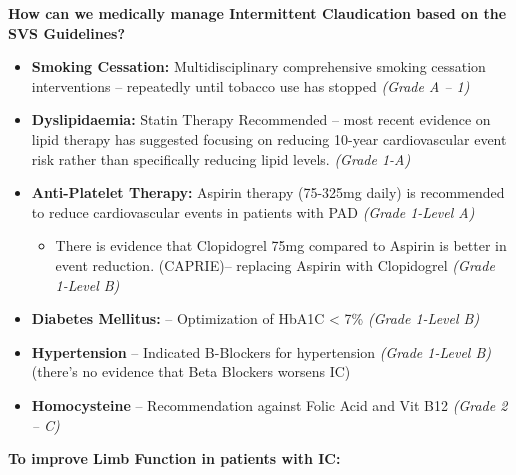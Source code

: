 \documentclass[
]{book}
\providecommand{\tightlist}{%
  \setlength{\itemsep}{0pt}\setlength{\parskip}{0pt}}
\begin{document}
\textbf{How can we medically manage Intermittent Claudication based on the SVS
Guidelines?}

\begin{itemize}
\item
  \textbf{Smoking Cessation:} Multidisciplinary comprehensive smoking
  cessation interventions -- repeatedly until tobacco use has stopped
  \emph{(Grade A -- 1)}
\item
  \textbf{Dyslipidaemia:} Statin Therapy Recommended -- most recent evidence on
  lipid therapy has suggested focusing on reducing 10-year
  cardiovascular event risk rather than specifically reducing lipid
  levels. \emph{(Grade 1-A)}
\item
  \textbf{Anti-Platelet Therapy:} Aspirin therapy (75-325mg daily) is recommended to
  reduce cardiovascular events in patients with PAD \emph{(Grade 1-Level A)}
  \citep{collaborationCollaborativeMetaanalysisRandomised2002}

  \begin{itemize}
  \tightlist
  \item
    There is evidence that Clopidogrel 75mg compared to Aspirin is
    better in event reduction.
    (CAPRIE)\citep{capriesteeringcommitteeRandomisedBlindedTrial1996}--
    replacing Aspirin with Clopidogrel \emph{(Grade 1-Level B)}
  \end{itemize}
\item
  \textbf{Diabetes Mellitus:} -- Optimization of HbA1C \textless{} 7\% \emph{(Grade 1-Level B)}
\item
  \textbf{Hypertension} -- Indicated B-Blockers for hypertension
  \emph{(Grade 1-Level B)} (there's no evidence that Beta Blockers worsens IC)
\item
  \textbf{Homocysteine} -- Recommendation against Folic Acid and Vit B12
  \emph{(Grade 2 -- C)}
\end{itemize}

\textbf{To improve Limb Function in patients with IC:}
\end{document}
